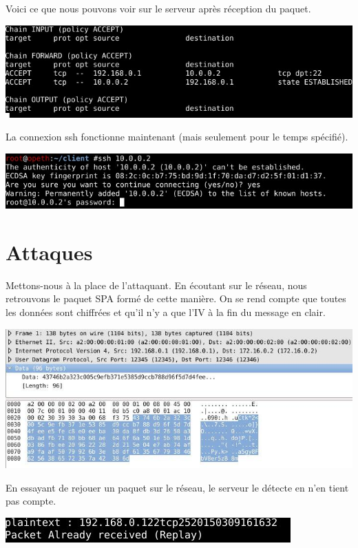 Voici ce que nous pouvons voir sur le serveur après réception du paquet.

\includegraphics[scale=0.75]{regles_apres.jpeg}

La connexion ssh fonctionne maintenant (mais seulement pour le temps spécifié).

\includegraphics[scale=0.75]{test_ssh2.jpeg}
\clearpage
\section{Attaques}

Mettons-nous à la place de l'attaquant. En écoutant sur le réseau, nous retrouvons le paquet SPA formé de cette manière. On se rend compte que toutes les données sont chiffrées et qu'il n'y a que l'IV à la fin du message en clair.

\includegraphics[scale=0.75]{wireshark.jpeg}

En essayant de rejouer un paquet sur le réseau, le serveur le détecte en n'en tient pas compte.

\includegraphics[scale=1]{rejeu.jpeg}
